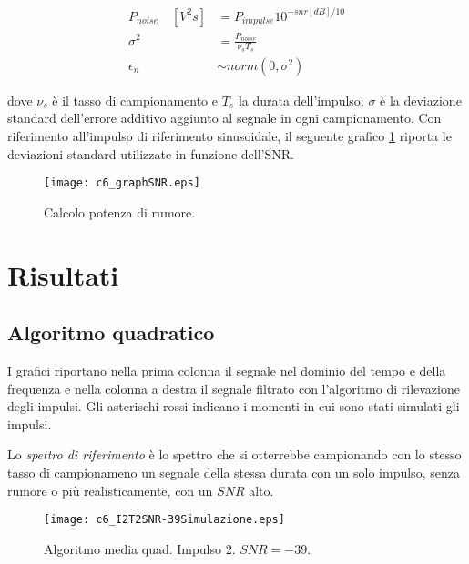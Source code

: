 \begin{align*}
P_{noise} \quad [V^2s] &=  P_{impulse} 10^{- snr [dB]/10} \\
\sigma^2 &= \frac{ P_{noise} }{ \nu_{s} T_{s} }\\
\epsilon_{n} &\sim norm(0,\sigma^2) 
\end{align*}

dove $\nu_{s} $ è il tasso di campionamento e $ T_{s} $ la durata dell'impulso; $\sigma$ è la deviazione standard dell'errore additivo aggiunto al segnale in ogni campionamento. Con riferimento all'impulso di riferimento sinusoidale, il seguente grafico \ref{fig:c6_graphSNR} riporta le deviazioni standard utilizzate in funzione dell'SNR.


\begin{figure}%
\centering    
\texttt{[image: c6\_graphSNR.eps]}
\caption[Calcolo potenza di rumore.]
{Calcolo potenza di rumore.}
\label{fig:c6_graphSNR}
\end{figure}






\chapter{Risultati}
\label{capitolo:risultati}
\graphicspath{{Graph/}}



\section{Algoritmo quadratico}

I grafici riportano nella prima colonna il segnale nel dominio del tempo e della frequenza e nella colonna a destra il segnale filtrato con l'algoritmo di rilevazione degli impulsi. Gli asterischi rossi indicano i momenti in cui sono stati simulati gli impulsi.

Lo {\it spettro di riferimento} è lo spettro che si otterrebbe campionando con lo stesso tasso di campionameno un segnale della stessa durata con un solo impulso, senza rumore o più realisticamente, con un $SNR$ alto.


\begin{figure}[tbp] 
\centering    
\texttt{[image: c6\_I2T2SNR-39Simulazione.eps]}
\caption[Algoritmo media quad. Impulso $2$. $SNR=-39$.]
{Algoritmo media quad. Impulso $2$. $SNR=-39$.}
\label{fig:c6_I2T2SNR-32Simulazione}
\end{figure}


